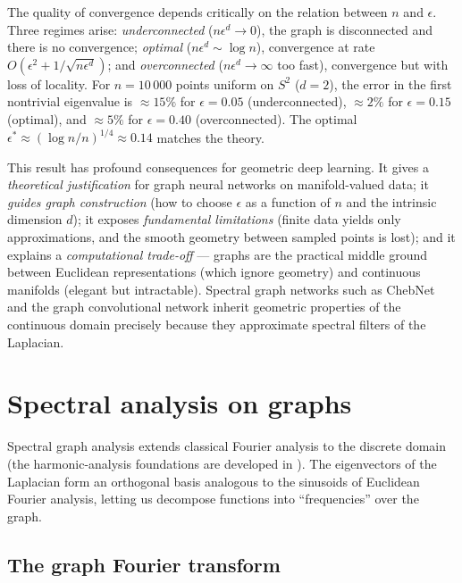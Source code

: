 \begin{remark}
\label{rem:graphs:convergence-rates}
The quality of convergence depends critically on the relation between $n$ and
$\epsilon$. Three regimes arise: \emph{underconnected} ($n\epsilon^d \to 0$), the
graph is disconnected and there is no convergence; \emph{optimal}
($n\epsilon^d \sim \log n$), convergence at rate
$O(\epsilon^2 + 1/\sqrt{n\epsilon^d})$; and \emph{overconnected}
($n\epsilon^d \to \infty$ too fast), convergence but with loss of locality. For
$n = 10\,000$ points uniform on $S^2$ ($d=2$), the error in the first nontrivial
eigenvalue is $\approx 15\%$ for $\epsilon = 0.05$ (underconnected),
$\approx 2\%$ for $\epsilon = 0.15$ (optimal), and $\approx 5\%$ for
$\epsilon = 0.40$ (overconnected). The optimal
$\epsilon^* \approx (\log n / n)^{1/4} \approx 0.14$ matches the theory.
\end{remark}

This result has profound consequences for geometric deep learning. It gives a
\emph{theoretical justification} for graph neural networks on manifold-valued
data; it \emph{guides graph construction} (how to choose $\epsilon$ as a function
of $n$ and the intrinsic dimension $d$); it exposes \emph{fundamental
limitations} (finite data yields only approximations, and the smooth geometry
between sampled points is lost); and it explains a \emph{computational trade-off}
--- graphs are the practical middle ground between Euclidean representations
(which ignore geometry) and continuous manifolds (elegant but intractable).
Spectral graph networks such as ChebNet and the graph convolutional network
inherit geometric properties of the continuous domain precisely because they
approximate spectral filters of the Laplacian.

\section{Spectral analysis on graphs}
\label{sec:graphs:spectral}

Spectral graph analysis extends classical Fourier analysis to the discrete
domain (the harmonic-analysis foundations are developed in ). The
eigenvectors of the Laplacian form an orthogonal basis analogous to the sinusoids
of Euclidean Fourier analysis, letting us decompose functions into
``frequencies'' over the graph.

\subsection{The graph Fourier transform}
\label{sec:graphs:gft}

